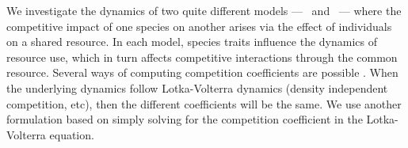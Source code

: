 \documentclass[a4paper,11pt]{article}
\begin{document}


We investigate the dynamics of two quite different models --- \plant\
and \Rstar\ --- where the competitive impact of one species on another
arises via the effect of individuals on a shared resource.
%
In each model, species traits influence the dynamics of resource use,
which in turn affects competitive interactions through the common
resource.  Several ways of computing competition coefficients are
possible \citep[e.g.,][]{Abrams-1987,Abrams-2008}.  When the
underlying dynamics follow Lotka-Volterra dynamics (density
independent competition, etc), then the different coefficients will be
the same.  We use another formulation based on simply solving for the
competition coefficient in the Lotka-Volterra equation.
\end{document}
